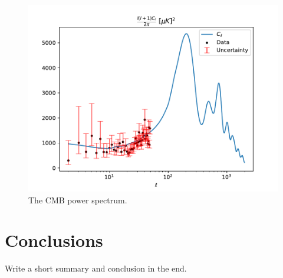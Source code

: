 \documentclass{aa}
\begin{document}
\begin{figure}[H]
   \includegraphics[scale=0.6]{../figures/milestone4/cell.pdf}
   \caption{The CMB power spectrum.}\label{fig:m4_cell}
\end{figure}
\section{Conclusions}

Write a short summary and conclusion in the end. 


%


%
\end{document}
